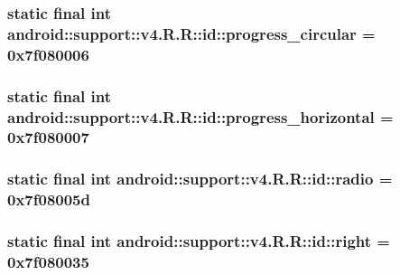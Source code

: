 \hypertarget{classandroid_1_1support_1_1v4_1_1_r_1_1id_a8f3df0e51806da55cb29d4066334af3}{
\subsubsection[{progress\_\-circular}]{\setlength{\rightskip}{0pt plus 5cm}static final int android::support::v4.R.R::id::progress\_\-circular = 0x7f080006}}
\label{classandroid_1_1support_1_1v4_1_1_r_1_1id_a8f3df0e51806da55cb29d4066334af3}


\hypertarget{classandroid_1_1support_1_1v4_1_1_r_1_1id_992b02c0497aae8f4efc804851658b8c}{
\subsubsection[{progress\_\-horizontal}]{\setlength{\rightskip}{0pt plus 5cm}static final int android::support::v4.R.R::id::progress\_\-horizontal = 0x7f080007}}
\label{classandroid_1_1support_1_1v4_1_1_r_1_1id_992b02c0497aae8f4efc804851658b8c}


\hypertarget{classandroid_1_1support_1_1v4_1_1_r_1_1id_4684f6a7b99ef9380f470fca3aedec14}{
\subsubsection[{radio}]{\setlength{\rightskip}{0pt plus 5cm}static final int android::support::v4.R.R::id::radio = 0x7f08005d}}
\label{classandroid_1_1support_1_1v4_1_1_r_1_1id_4684f6a7b99ef9380f470fca3aedec14}


\hypertarget{classandroid_1_1support_1_1v4_1_1_r_1_1id_c97f225c8ea89ee3d5760b2515fcfcdb}{
\subsubsection[{right}]{\setlength{\rightskip}{0pt plus 5cm}static final int android::support::v4.R.R::id::right = 0x7f080035}}
\label{classandroid_1_1support_1_1v4_1_1_r_1_1id_c97f225c8ea89ee3d5760b2515fcfcdb}


